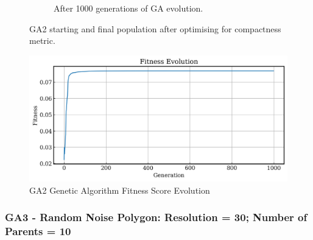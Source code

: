 \documentclass{article}
\begin{document}
\begin{figure}[H]
\begin{subfigure}[b]{0.45\textwidth}
        \caption{After 1000 generations of GA evolution.}
        \label{fig:GA2_final}
    \end{subfigure}
    \caption{GA2 starting and final population after optimising for compactness metric.}
    \label{fig:GA2_before_after_GA}
\end{figure}

\begin{figure}[H]
    \centering
    \includegraphics[width=0.75\linewidth]{figures/GAResults/GA2/1000gens_10pars_100initpop_5pcent_mut.png}
    \caption{GA2 Genetic Algorithm Fitness Score Evolution}
    \label{fig:GA2_fitness}
\end{figure}



\subsubsection{GA3 - Random Noise Polygon: Resolution = 30; Number of Parents = 10}
\end{document}
